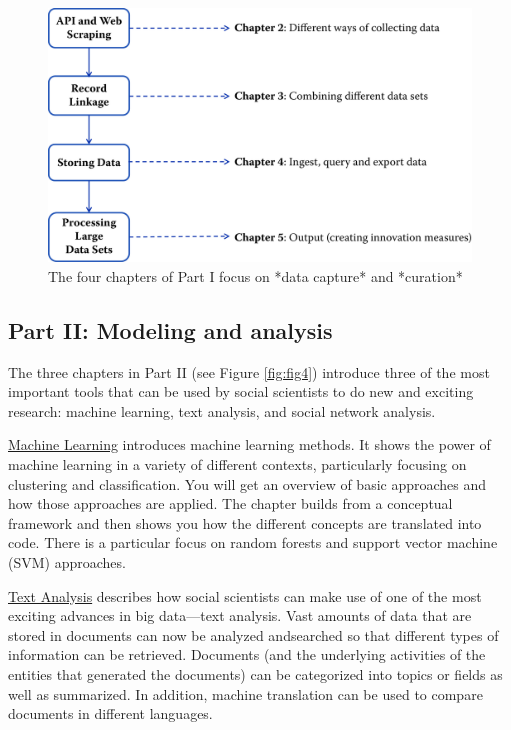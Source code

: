\documentclass[]{krantz}
\begin{document}
\begin{figure}

{\centering \includegraphics[width=0.7\linewidth]{ChapterIntro/figures/Figure2} 

}

\caption{The four chapters of Part I focus on *data capture* and *curation*}\label{fig:fig3}
\end{figure}

\subsection{Part II: Modeling and
analysis}\label{part-ii-modeling-and-analysis}

The three chapters in Part II (see Figure \ref{fig:fig4}) introduce
three of the most important tools that can be used by social scientists
to do new and exciting research: machine learning, text analysis, and
social network analysis.

\protect\hyperlink{chap:ml}{Machine Learning} introduces machine
learning methods. It shows the power of machine learning in a variety of
different contexts, particularly focusing on clustering and
classification. You will get an overview of basic approaches and how
those approaches are applied. The chapter builds from a conceptual
framework and then shows you how the different concepts are translated
into code. There is a particular focus on random forests and support
vector machine (SVM) approaches.

\protect\hyperlink{chap:text}{Text Analysis} describes how social
scientists can make use of one of the most exciting advances in big
data---text analysis. Vast amounts of data that are stored in documents
can now be analyzed andsearched so that different types of information
can be retrieved. Documents (and the underlying activities of the
entities that generated the documents) can be categorized into topics or
fields as well as summarized. In addition, machine translation can be
used to compare documents in different languages.
\end{document}
